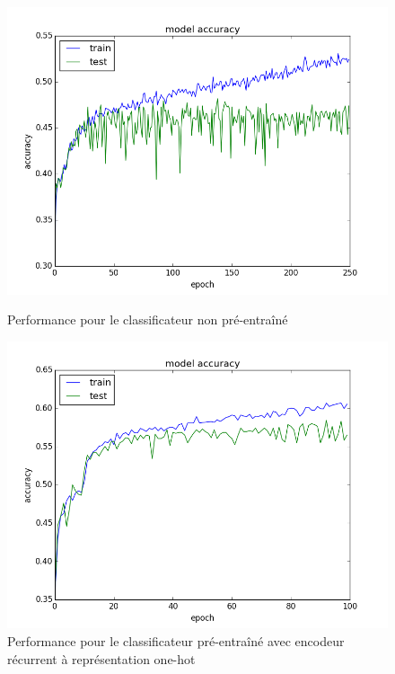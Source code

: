 \documentclass[a4paper, 11pt, onecolumn]{article}
\begin{document}
\begin{figure}[!tbp]
\centering  
  \begin{minipage}[b]{0.3\textwidth}
    \includegraphics[width=1.1\textwidth]{SupClass}
    \caption{Performance pour le classificateur non pré-entraîné}
  \end{minipage}
  \hfill
  \begin{minipage}[b]{0.3\textwidth}
    \includegraphics[width=\textwidth]{SpeClass}
    \caption{Performance pour le classificateur pré-entraîné avec encodeur
      récurrent à représentation one-hot}
  \end{minipage}
  \hfill
  \begin{minipage}[b]{0.3\textwidth}

\end{minipage}
\end{figure}
\end{document}
